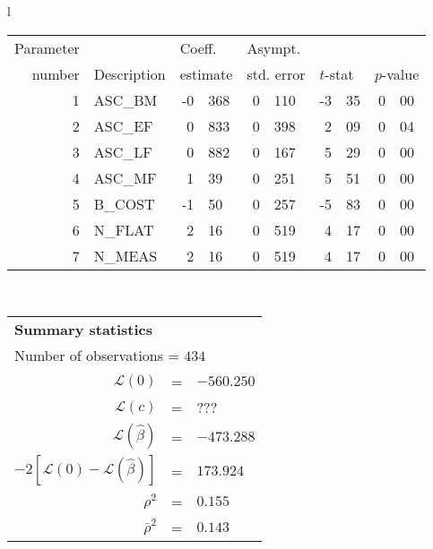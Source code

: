   \begin{tabular}{l}
\begin{tabular}{rlr@{.}lr@{.}lr@{.}lr@{.}l}
Parameter &                       &   \multicolumn{2}{l}{Coeff.}      & \multicolumn{2}{l}{Asympt.}  &     \multicolumn{4}{l}{}   \\
number &  Description                     &   \multicolumn{2}{l}{estimate}      & \multicolumn{2}{l}{std. error}  &   \multicolumn{2}{l}{$t$-stat}  &   \multicolumn{2}{l}{$p$-value}   \\

\hline

1 & ASC\_BM & -0&368 & 0&110 & -3&35 & 0&00 \\
2 & ASC\_EF & 0&833 & 0&398 & 2&09 & 0&04 \\
3 & ASC\_LF & 0&882 & 0&167 & 5&29 & 0&00 \\
4 & ASC\_MF & 1&39 & 0&251 & 5&51 & 0&00 \\
5 & B\_COST & -1&50 & 0&257 & -5&83 & 0&00 \\
\hline
6 & N\_FLAT & 2&16 & 0&519 & 4&17\footnotemark[1] & 0&00 \\
7 & N\_MEAS & 2&16 & 0&519 & 4&17\footnotemark[1] & 0&00 \\
\hline

\end{tabular}
\\
\begin{tabular}{rcl}
\multicolumn{3}{l}{\bf Summary statistics}\\
\multicolumn{3}{l}{ Number of observations = $434$} \\
 $\mathcal{L}(0)$ &=&  $-560.250$ \\
 $\mathcal{L}(c)$ &=& ???\\
 $\mathcal{L}(\hat{\beta})$ &=& $-473.288 $  \\
 $-2[\mathcal{L}(0) -\mathcal{L}(\hat{\beta})]$ &=& $173.924$ \\
    $\rho^2$ &=&   $0.155$ \\
    $\bar{\rho}^2$ &=&    $0.143$ \\
\end{tabular}
\end{tabular}


